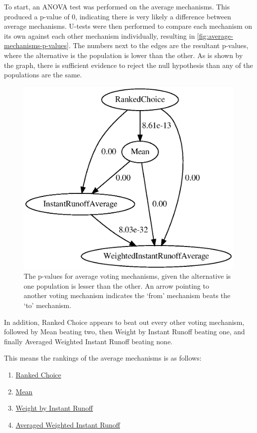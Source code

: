 To start, an ANOVA test was performed on the average mechanisms.
This produced a p-value of 0, indicating there is very likely a difference between
average mechanisms.
U-tests were then performed to compare each mechanism on its own against each other
mechanism individually, resulting in \autoref{fig:average-mechanisms-p-values}.
The numbers next to the edges are the resultant p-values, where the alternative is
the population is lower than the other.
As is shown by the graph, there is sufficient evidence to reject the null hypothesis
than any of the populations are the same.

\begin{figure}[htbp]
    \centering
    \includegraphics[scale=0.75]
    {./content/figures/voting_mechanisms/average-mechanisms-p-values.gv}
    \caption{The p-values for average voting mechanisms, given the alternative is one
    population is lesser than the other.
    An arrow pointing to another voting mechanism indicates the `from' mechanism
    beats the `to' mechanism.}
    \label{fig:average-mechanisms-p-values}
\end{figure}

In addition, Ranked Choice appears to beat out every other voting mechanism, followed
by Mean beating two, then Weight by Instant Runoff beating one, and finally Averaged
Weighted Instant Runoff beating none.
\begin{samepage}
    This means the rankings of the average mechanisms is as follows:
    \begin{enumerate}
        \item \hyperref[para:avg-ranked-choice]{Ranked Choice}
        \item \hyperref[para:mean]{Mean}
        \item \hyperref[para:avg-instant-runoff]{Weight by Instant Runoff}
        \item \hyperref[para:avg-weighted-instant-runoff]{Averaged Weighted Instant
        Runoff}
    \end{enumerate}
\end{samepage}


